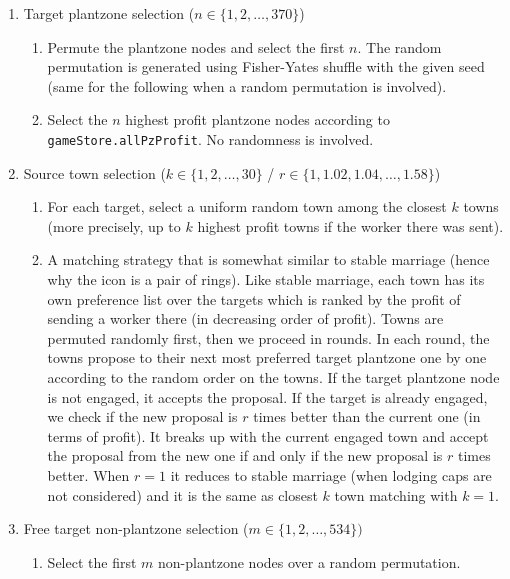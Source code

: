 \documentclass[11pt]{article}
\theoremstyle{definition}
\theoremstyle{remark}
\begin{document}
\begin{enumerate}
    \item[$\bullet$] Target plantzone selection ($n \in \{1, 2, \dots, 370\}$)

    \begin{enumerate}
        \item Permute the plantzone nodes and select the first $n$. The random permutation is generated using Fisher-Yates shuffle with the given seed (same for the following when a random permutation is involved).

        \item Select the $n$ highest profit plantzone nodes according to \texttt{gameStore.allPzProfit}. No randomness is involved.
    \end{enumerate}

    \item[$\bullet$] Source town selection ($k \in \{1, 2, \dots, 30\}$ / $r \in \{1, 1.02, 1.04, \dots, 1.58\}$)

    \begin{enumerate}
        \item For each target, select a uniform random town among the closest $k$ towns (more precisely, up to $k$ highest profit towns if the worker there was sent).

        \item A matching strategy that is somewhat similar to stable marriage (hence why the icon is a pair of rings). Like stable marriage, each town has its own preference list over the targets which is ranked by the profit of sending a worker there (in decreasing order of profit). Towns are permuted randomly first, then we proceed in rounds. In each round, the towns propose to their next most preferred target plantzone one by one according to the random order on the towns. If the target plantzone node is not engaged, it accepts the proposal. If the target is already engaged, we check if the new proposal is $r$ times better than the current one (in terms of profit). It breaks up with the current engaged town and accept the proposal from the new one if and only if the new proposal is $r$ times better. When $r = 1$ it reduces to stable marriage (when lodging caps are not considered) and it is the same as closest $k$ town matching with $k = 1$.
    \end{enumerate}

    \item[$\bullet$] Free target non-plantzone selection ($m \in \{1, 2, \dots, 534\})$

    \begin{enumerate}
        \item[$\circ$] Select the first $m$ non-plantzone nodes over a random permutation.
    \end{enumerate}
\end{enumerate}
\end{document}
